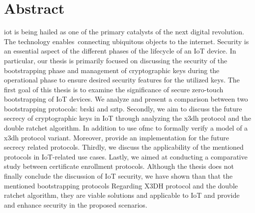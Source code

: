 \chapter*{Abstract}
\gls{iot} is being hailed as one of the primary catalysts of the next digital revolution. The technology enables connecting ubiquitous objects to the internet. 
Security is an essential aspect of the different phases of the lifecycle of an IoT device.
In particular, our thesis is primarily focused on discussing the security of the bootstrapping phase and management of cryptographic keys during the operational phase to ensure desired security features for the utilized keys.
The first goal of this thesis is to examine the significance of secure zero-touch bootstrapping of IoT devices. We analyze and present a comparison between two bootstrapping protocols: \gls{brski} and \gls{sztp}. 
Secondly, we aim to discuss the future secrecy of cryptographic keys in IoT through analyzing the \gls{x3dh} protocol and the double ratchet algorithm. In addition to use \gls{ofmc} to formally verify a model of a \gls{x3dh} protocol variant. Moreover, provide an implementation for the future secrecy related protocols.
Thirdly, we discuss the applicability of the mentioned protocols in IoT-related use cases.
Lastly, we aimed at conducting a comparative study between certificate enrollment protocols.
Although the thesis does not finally conclude the discussion of IoT security, we have shown than that the mentioned bootstrapping protocols
Regarding X3DH protocol and the double ratchet algorithm, they are viable solutions and applicable to IoT and provide and enhance security in the proposed scenarios.
